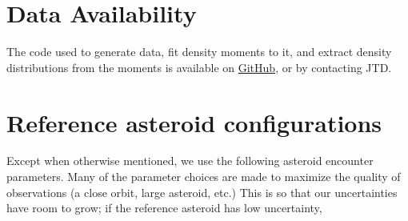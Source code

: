 \documentclass[fleqn,usenatbib]{mnras}
\begin{document}
\section*{Data Availability}

The code used to generate data, fit density moments to it, and extract density distributions from the moments is available on \href{https://github.com/jack-dinsmore/asteroid-tidal-torque}{GitHub}, or by contacting JTD.









\appendix

\section{Reference asteroid configurations}
\label{app:reference-configs}

Except when otherwise mentioned, we use the following asteroid encounter parameters. Many of the parameter choices are made to maximize the quality of observations (a close orbit, large asteroid, etc.) This is so that our uncertainties have room to grow; if the reference asteroid has low uncertainty,
\end{document}
